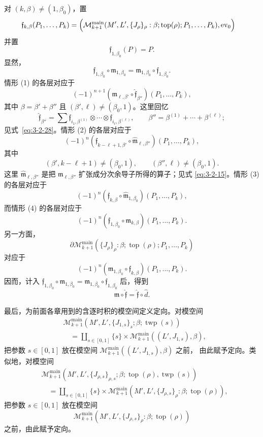 对 $(k,\beta)\ne(1,\beta_0)$，置
\[
\begin{aligned}
 \mathfrak f_{k,\beta}(P_1,\ldots,P_k)
 =\Bigl(&\mathcal M_{k+1}^{\mathrm{main}}
 (M',L',\{J_\rho\}_\rho:\beta;\operatorname{top}(\rho);
 P_1,\ldots,P_k),\operatorname{ev}_0\Bigr)
\end{aligned}
\]
并置
\[
 \mathfrak f_{1,\beta_0}(P)=P.
\]
显然，
\[
 \mathfrak f_{1,\beta_0}\circ\mathfrak m_{1,\beta_0}
 =\mathfrak m_{1,\beta_0}\circ\mathfrak f_{1,\beta_0}.
\]
情形 (1) 的各层对应于
\[
 (-1)^{n+1}
 (\mathfrak m_{\ell,\beta'}\circ
  \widehat{\mathfrak f}_{\beta''})(P_1,\ldots,P_k),
\]
其中 $\beta=\beta'+\beta''$ 且
$(\beta',\ell)\ne(\beta_0,1)$。这里回忆
\[
 \widehat{\mathfrak f}_{\beta''}
 =\sum
 \mathfrak f_{i_1,\beta^{(1)}}\otimes\cdots\otimes
 \mathfrak f_{i_\ell,\beta^{(\ell)}},
 \qquad
 \beta''=\beta^{(1)}+\cdots+\beta^{(\ell)};
\]
见式~\eqref{eq:3-2-28}。情形 (2) 的各层对应于
\[
 (-1)^n
 (\mathfrak f_{k-\ell+1,\beta'}\circ
  \widehat{\mathfrak m}_{\ell,\beta''})(P_1,\ldots,P_k),
\]
其中
\[
 (\beta',k-\ell+1)\ne(\beta_0,1),
 \qquad
 (\beta'',\ell)\ne(\beta_0,1).
\]
这里 $\widehat{\mathfrak m}_{\ell,\beta''}$ 是把
$\mathfrak m_{\ell,\beta''}$ 扩张成分次余导子所得的算子；见式
\eqref{eq:3-2-15}。情形 (3) 的各层对应于
\[
 (-1)^n
 (\mathfrak f_{k,\beta}\circ
  \widehat{\mathfrak m}_{1,\beta_0})(P_1,\ldots,P_k),
\]
而情形 (4) 的各层对应于
\[
 (-1)^n
 (\mathfrak f_{1,\beta_0}\circ
  \mathfrak m_{k,\beta})(P_1,\ldots,P_k).
\]
另一方面，
\[
 \partial\mathcal M_{k+1}^{\mathrm{main}}
 (\{J_\rho\}_\rho:\beta;\operatorname{top}(\rho);
 P_1,\ldots,P_k)
\]
对应于
\[
 (-1)^n
 (\mathfrak m_{1,\beta_0}\circ
  \mathfrak f_{k,\beta})(P_1,\ldots,P_k).
\]
因而，计入
$\mathfrak f_{1,\beta_0}\circ\mathfrak m_{1,\beta_0}
=\mathfrak m_{1,\beta_0}\circ\mathfrak f_{1,\beta_0}$ 后，得到
\[
 \mathfrak m\circ\widehat{\mathfrak f}
 =\widehat{\mathfrak f}\circ\widehat d.
\]

最后，为前面各章用到的含逐时积的模空间定义定向。对模空间
\[
\begin{aligned}
 &\mathcal M_{k+1}^{\mathrm{main}}
 (M',L',\{J_{1,s}\}_s;\beta;\operatorname{twp}(s))\\
 &\quad=
 \coprod_{s\in[0,1]}\{s\}\times
 \mathcal M_{k+1}^{\mathrm{main}}
 ((L',J_{1,s}),\beta),
\end{aligned}
\]
把参数 $s\in[0,1]$ 放在模空间
$\mathcal M_{k+1}^{\mathrm{main}}((L',J_{1,s}),\beta)$ 之前，
由此赋予定向。类似地，对模空间
\[
\begin{aligned}
 &\mathcal M_{k+1}^{\mathrm{main}}
 (M',L',\{J_{\rho,s}\}_{\rho,s};\beta;
  \operatorname{top}(\rho),\operatorname{twp}(s))\\
 &\quad=
 \coprod_{s\in[0,1]}\{s\}\times
 \mathcal M_{k+1}^{\mathrm{main}}
 (M',L',\{J_{\rho,s}\}_\rho:\beta;
  \operatorname{top}(\rho)),
\end{aligned}
\]
把参数 $s\in[0,1]$ 放在模空间
\[
 \mathcal M_{k+1}^{\mathrm{main}}
 (M',L',\{J_{\rho,s}\}_\rho:\beta;\operatorname{top}(\rho))
\]
之前，由此赋予定向。
